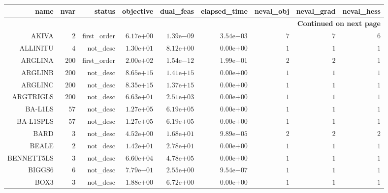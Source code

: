 \begin{longtable}{rrrrrrrrr}
\hline
name & nvar & status & objective & dual\_feas & elapsed\_time & neval\_obj & neval\_grad & neval\_hess \\\hline
\endhead
\hline
\multicolumn{9}{r}{{\bfseries Continued on next page}}\\
\hline
\endfoot
\endlastfoot
AKIVA & \(     2\) & first\_order & \( 6.17\)e\(+00\) & \( 1.39\)e\(-09\) & \( 3.54\)e\(-03\) & \(     7\) & \(     7\) & \(     6\) \\
ALLINITU & \(     4\) & not\_desc & \( 1.30\)e\(+01\) & \( 8.12\)e\(+00\) & \( 0.00\)e\(+00\) & \(     1\) & \(     1\) & \(     1\) \\
ARGLINA & \(   200\) & first\_order & \( 2.00\)e\(+02\) & \( 1.54\)e\(-12\) & \( 1.99\)e\(-01\) & \(     2\) & \(     2\) & \(     1\) \\
ARGLINB & \(   200\) & not\_desc & \( 8.65\)e\(+15\) & \( 1.41\)e\(+15\) & \( 0.00\)e\(+00\) & \(     1\) & \(     1\) & \(     1\) \\
ARGLINC & \(   200\) & not\_desc & \( 8.35\)e\(+15\) & \( 1.37\)e\(+15\) & \( 0.00\)e\(+00\) & \(     1\) & \(     1\) & \(     1\) \\
ARGTRIGLS & \(   200\) & not\_desc & \( 6.63\)e\(+01\) & \( 2.51\)e\(+03\) & \( 0.00\)e\(+00\) & \(     1\) & \(     1\) & \(     1\) \\
BA-L1LS & \(    57\) & not\_desc & \( 1.27\)e\(+05\) & \( 6.19\)e\(+05\) & \( 0.00\)e\(+00\) & \(     1\) & \(     1\) & \(     1\) \\
BA-L1SPLS & \(    57\) & not\_desc & \( 1.27\)e\(+05\) & \( 6.19\)e\(+05\) & \( 0.00\)e\(+00\) & \(     1\) & \(     1\) & \(     1\) \\
BARD & \(     3\) & not\_desc & \( 4.52\)e\(+00\) & \( 1.68\)e\(+01\) & \( 9.89\)e\(-05\) & \(     2\) & \(     2\) & \(     2\) \\
BEALE & \(     2\) & not\_desc & \( 1.42\)e\(+01\) & \( 2.78\)e\(+01\) & \( 0.00\)e\(+00\) & \(     1\) & \(     1\) & \(     1\) \\
BENNETT5LS & \(     3\) & not\_desc & \( 6.60\)e\(+04\) & \( 4.78\)e\(+05\) & \( 0.00\)e\(+00\) & \(     1\) & \(     1\) & \(     1\) \\
BIGGS6 & \(     6\) & not\_desc & \( 7.79\)e\(-01\) & \( 2.55\)e\(+00\) & \( 9.54\)e\(-07\) & \(     1\) & \(     1\) & \(     1\) \\
BOX3 & \(     3\) & not\_desc & \( 1.88\)e\(+00\) & \( 6.72\)e\(+00\) & \( 0.00\)e\(+00\) & \(     1\) & \(     1\) & \(     1\) \\

\end{longtable}
